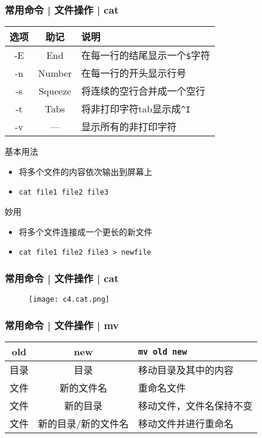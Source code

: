 \begin{frame}[fragile]
  \frametitle{常用命令 | 文件操作 | cat}
  \begin{table}
    \centering
    \begin{tabularx}{0.9\textwidth}{ccX}
      \hline
      \rowcolor{blue!50}选项 & 助记 & 说明\\
      \hline
      -E & End & 在每一行的结尾显示一个\verb|$|字符\\
      -n & Number & 在每一行的开头显示行号\\
      -s & Squeeze & 将连续的空行合并成一个空行\\
      -t & Tabs & 将非打印字符tab显示成\verb|^I|\\
      -v & --- & 显示所有的非打印字符\\
      \hline
    \end{tabularx}
  \end{table}
  \pause
  \begin{block}{基本用法}
    \begin{itemize}
      \item 将多个文件的内容依次输出到屏幕上
      \item \verb|cat file1 file2 file3|
    \end{itemize}
  \end{block}
  \pause
  \begin{block}{\alert{妙用}}
    \begin{itemize}
      \item 将多个文件连接成一个更长的新文件
      \item \verb|cat file1 file2 file3 > newfile|
    \end{itemize}
  \end{block}
\end{frame}

\begin{frame}[fragile]
  \frametitle{常用命令 | 文件操作 | cat}
  \begin{figure}
    \centering
    \texttt{[image: c4.cat.png]}
  \end{figure}
\end{frame}

\begin{frame}[fragile]
  \frametitle{常用命令 | 文件操作 | \alert{mv}}
  \begin{table}
    \centering
    \begin{tabularx}{0.9\textwidth}{ccX}
      \hline
      \rowcolor{blue!50}old & new & \verb|mv old new|\\
      \hline
      目录 & 目录 & 移动目录及其中的内容\\
      文件 & 新的文件名 & 重命名文件\\
      文件 & 新的目录 & 移动文件，文件名保持不变\\
      文件 & 新的目录/新的文件名 & 移动文件并进行重命名\\
      \hline
    \end{tabularx}
  \end{table}
\end{frame}

